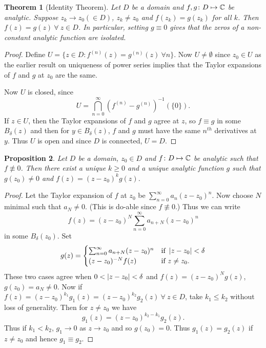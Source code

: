 \documentclass{notes}
\theoremstyle{plain}
\newtheorem{proposition}{Proposition}[chapter]
\newtheorem{theorem}[proposition]{Theorem}
\begin{document}
\begin{theorem}[Identity Theorem]%
Let $D$ be a domain and $f,g \colon D \mapsto \mathbb{C}$ be analytic.  Suppose 
$z_k \rightarrow z_0 (\in D)$, $z_k \neq z_0$ and $f(z_k) = g(z_k)$
for all $k$.  Then $f(z) = g(z)\ \forall\ z \in D$.  In particular,
setting $g \equiv 0$ gives that the zeros of a non-constant analytic function
are isolated.
\end{theorem}

\begin{proof}
Define $U = \{ z \in D : f^{(n)} (z) = g^{(n)} (z)\ \forall n\}$.  Now 
$U \ne \emptyset$ since $z_0 \in U$ as the earlier result on uniqueness of
power series implies that the Taylor expansions of $f$ and $g$ at $z_0$ are
the same.

Now $U$ is closed, since
\[
U = \bigcap_{n=0}^\infty \left ( f^{(n)} - g^{(n)} \right)^{-1} \left( \{ 0 \}
\right).
\]
If $z \in U$, then the Taylor expansions of $f$ and $g$ agree at $z$, so
$f \equiv g$ in some $B_\delta(z)$ and then for $y \in B_\delta(z)$, $f$ and
$g$ must have the same $n^{th}$ derivatives at $y$.  Thus $U$ is open and
since $D$ is connected, $U = D$. 
\end{proof}

\begin{proposition}
Let $D$ be a domain, $z_0 \in D$ and $f \colon D \mapsto \mathbb{C}$ be analytic such that
$f \not \equiv 0$.  Then there exist a unique $k \ge 0$ and a unique analytic
function $g$ such that $g(z_0) \neq 0$ and $f(z) = (z - z_0)^k g(z)$.
\end{proposition}

\begin{proof}
Let the Taylor expansion of $f$ at $z_0$ be $\sum_{n=0}^\infty a_n (z-z_0)^n$.
Now choose $N$ minimal such that $a_N \neq 0$.  (This is do-able since $f \not
\equiv 0$.)  Thus we can write 
\[
f(z) = (z-z_0)^N \sum_{n=0}^\infty a_{n+N} (z-z_0)^n
\]
in some $B_\delta(z_0)$.  Set
\[
g(z) = \begin{cases}
\sum_{n=0}^\infty a_{n+N} (z-z_0)^n & \text{if } \left|z-z_0\right| < \delta \\
(z - z_0)^{-N} f(z) & \text{if } z \neq z_0.
\end{cases}
\]
These two cases agree when $0 < \left|z-z_0\right| < \delta$ and 
$f(z) = (z-z_0)^N g(z)$, $g(z_0) = a_N \neq 0$.  Now if 
$f(z) = (z-z_0)^{k_1} g_1(z) = (z-z_0)^{k_2} g_2(z)\ \forall\ z \in D$,
take $k_1 \le k_2$ without loss of generality.  Then for $z \neq z_0$ we
have
\[
g_1 (z) = (z-z_0)^{k_2-k_1} g_2(z).
\]
Thus if $k_1 < k_2$, $g_1 \rightarrow 0$ as $z \rightarrow z_0$ and so
$g(z_0) = 0$.  Thus $g_1(z) = g_2(z)$ if $z \neq z_0$ and hence $g_1 \equiv
g_2$.
\end{proof}
\end{document}
